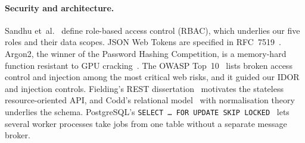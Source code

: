 \paragraph{Security and architecture.}
Sandhu et~al.~\cite{sandhu1996} define role-based access control (RBAC), which underlies our five
roles and their data scopes. JSON Web Tokens are specified in RFC~7519~\cite{rfc7519}. Argon2, the
winner of the Password Hashing Competition, is a memory-hard function resistant to GPU
cracking~\cite{biryukov2016}. The OWASP Top~10~\cite{owasp2021} lists broken access control and
injection among the most critical web risks, and it guided our IDOR and injection controls.
Fielding's REST dissertation~\cite{fielding2000} motivates the stateless resource-oriented API, and
Codd's relational model~\cite{codd1970} with normalisation theory~\cite{silberschatz2019} underlies
the schema. PostgreSQL's \texttt{SELECT \ldots{} FOR UPDATE SKIP LOCKED}~\cite{postgresdocs} lets
several worker processes take jobs from one table without a separate message broker.

